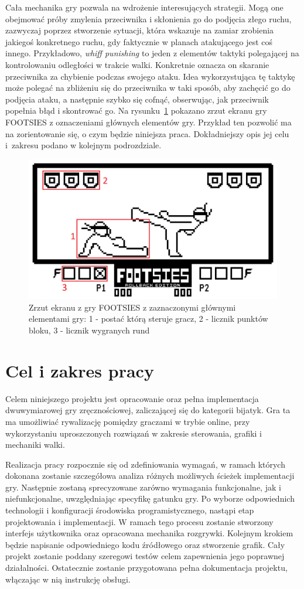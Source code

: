Cała mechanika gry pozwala na wdrożenie interesujących strategii. Mogą one obejmować próby zmylenia przeciwnika i skłonienia go do podjęcia złego ruchu, zazwyczaj poprzez stworzenie sytuacji, która wskazuje na zamiar zrobienia jakiegoś konkretnego ruchu, gdy faktycznie w planach atakującego jest coś innego. Przykładowo, \emph{whiff punishing} to jeden z elementów taktyki polegającej na kontrolowaniu odległości w trakcie walki. Konkretnie oznacza on skaranie przeciwnika za chybienie podczas swojego ataku. Idea wykorzystująca tę taktykę może polegać na zbliżeniu się do przeciwnika w taki sposób, aby zachęcić go do podjęcia ataku, a następnie szybko się cofnąć, obserwując, jak przeciwnik popełnia błąd i skontrować go. 
Na rysunku~\ref{fig:footsies} pokazano zrzut ekranu gry FOOTSIES z oznaczeniami głównych elementów gry. Przykład ten pozwolić ma na zorientowanie się, o czym będzie niniejsza praca. Dokładniejszy opis jej celu i~zakresu podano w kolejnym podrozdziale.
\begin{figure}
	\centering
		\includegraphics[width=0.64\linewidth]{rys01/footsies}
	\caption{Zrzut ekranu z gry FOOTSIES z zaznaczonymi głównymi elementami gry: 1 - postać którą steruje gracz, 2 - licznik punktów bloku, 3 - licznik wygranych rund}
	\label{fig:footsies}
\end{figure}



\section{Cel i zakres pracy}
Celem niniejszego projektu jest opracowanie oraz pełna implementacja dwuwymiarowej gry zręcznościowej, zaliczającej się do kategorii bijatyk. Gra ta ma umożliwiać rywalizację pomiędzy graczami w trybie online, przy wykorzystaniu uproszczonych rozwiązań w zakresie sterowania, grafiki i mechaniki walki.

Realizacja pracy rozpocznie się od zdefiniowania wymagań, w ramach których dokonana zostanie szczegółowa analiza różnych możliwych ścieżek implementacji gry. Następnie zostaną sprecyzowane zarówno wymagania funkcjonalne, jak i niefunkcjonalne, uwzględniając specyfikę gatunku gry. Po wyborze odpowiednich technologii i konfiguracji środowiska programistycznego, nastąpi etap projektowania i implementacji. W ramach tego procesu zostanie stworzony interfejs użytkownika oraz opracowana mechanika rozgrywki. Kolejnym krokiem będzie napisanie odpowiedniego kodu źródłowego oraz stworzenie grafik. Cały projekt zostanie poddany szeregowi testów celem zapewnienia jego poprawnej działalności. Ostatecznie zostanie przygotowana pełna dokumentacja projektu, włączając w nią instrukcję obsługi.

